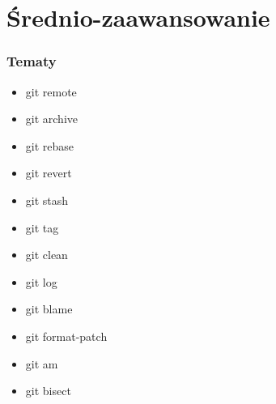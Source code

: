 \documentclass[10pt]{beamer}
\begin{document}
\section{Średnio-zaawansowanie}
\begin{frame}
	\frametitle{Tematy}
		\begin{itemize}
		\item git remote
		\item git archive
		\item git rebase
		\item git revert
		\item git stash
		\item git tag
		\item git clean
		\item git log
		\item git blame
		\item git format-patch
		\item git am
		\item git bisect
		\end{itemize}
\end{frame}
\end{document}
